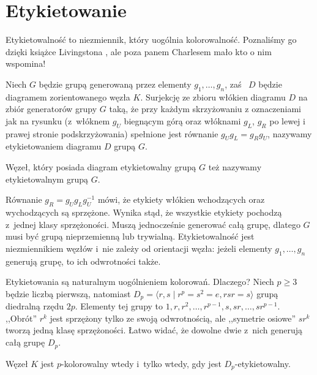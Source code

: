 
\section{Etykietowanie}

Etykietowalność to niezmiennik, który uogólnia kolorowalność.
Poznaliśmy go dzięki książce Livingstona \cite[s. 89-99]{livingston1993}, ale poza panem Charlesem mało kto o nim wspomina!

\begin{definition}[etykietowanie]
    Niech $G$ będzie grupą generowaną przez elementy $g_1, \ldots, g_n$, zaś  $D$ będzie diagramem zorientowanego węzła $K$.
    Surjekcję ze zbioru włókien diagramu $D$ na zbiór generatorów grupy $G$ taką, że przy każdym skrzyżowaniu z oznaczeniami jak na rysunku (z~włóknem $g_U$ biegnącym górą oraz włóknami $g_L$, $g_R$ po lewej i prawej stronie podskrzyżowania) spełnione jest równanie $g_Ug_L = g_Rg_U$, nazywamy etykietowaniem diagramu $D$ grupą $G$.
\begin{comment}
        \[
            \LargePlusCrossingLabel
        \]
\end{comment}
    Węzeł, który posiada diagram etykietowalny grupą $G$ też nazywamy etykietowalnym grupą $G$.
\end{definition}

Równanie $g_R = g_Ug_Lg_U^{-1}$ mówi, że etykiety włókien wchodzących oraz wychodzących są sprzężone.
Wynika stąd, że wszystkie etykiety pochodzą z~jednej klasy sprzężoności.
Muszą jednocześnie generować całą grupę, dlatego $G$ musi być grupą nieprzemienną lub trywialną.
Etykietowalność jest niezmiennikiem węzłów i~nie zależy od orientacji węzła: jeżeli elementy $g_1, \ldots, g_n$ generują grupę, to ich odwrotności także.

Etykietowania są naturalnym uogólnieniem kolorowań.
Dlaczego?
Niech $p \ge 3$ będzie liczbą pierwszą, natomiast $D_p = \langle r, s \mid r^p = s^2 = e, rsr = s \rangle$ grupą diedralną rzędu $2p$.
Elementy tej grupy to $1, r, r^2, \ldots, r^{p-1}, s, sr, \ldots, sr^{p-1}$.
,,Obrót'' $r^k$ jest sprzężony tylko ze swoją odwrotnością, ale ,,symetrie osiowe'' $sr^k$ tworzą jedną klasę sprzężoności.
Łatwo widać, że dowolne dwie z~nich generują całą grupę $D_p$.

\begin{proposition}
    Węzeł $K$ jest $p$-kolorowalny wtedy i~tylko wtedy, gdy jest $D_p$-etykietowalny.
\end{proposition}

